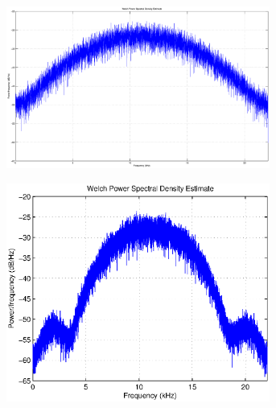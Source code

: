 \documentclass[12pt,a4paper,openright]{report}
\begin{document}
	 \begin{figure}[H]
	 \centering
	\begin{subfigure}[h]{0.32\textwidth}
	 \centering
	    \includegraphics[width=0.95\textwidth]{psdalfa25.eps}
	    \label{fig:psd25}	
	\end{subfigure}
	\begin{subfigure}[H]{0.33\textwidth}
	 \centering
	    \includegraphics[width=0.95\textwidth]{psdalfa15.eps}
	    \label{fig:psd15}
	    \end{subfigure}
	    \begin{subfigure}[H]{0.33\textwidth}
	 \centering

\end{subfigure}
\end{figure}
\end{document}
